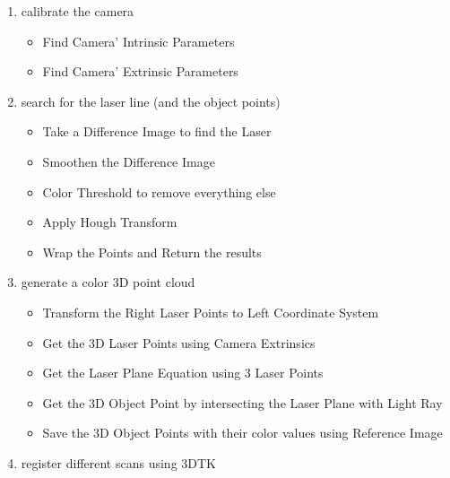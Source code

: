 
\begin{enumerate}
	\item calibrate the camera \cite{tsai:1987}
		\begin{itemize}
			\item Find Camera' Intrinsic Parameters
	    \item Find Camera' Extrinsic Parameters
		\end{itemize}
	\item search for the laser line (and the object points)	
		\begin{itemize}
			\item Take a Difference Image to find the Laser
	    \item Smoothen the Difference Image
	    \item Color Threshold to remove everything else
	    \item Apply Hough Transform
	    \item Wrap the Points and Return the results
		\end{itemize}	
	\item generate a color 3D point cloud	
		\begin{itemize}
			\item Transform the Right Laser Points to Left Coordinate System
	    \item Get the 3D Laser Points using Camera Extrinsics
	    \item Get the Laser Plane Equation using 3 Laser Points
	    \item Get the 3D Object Point by intersecting the
	 					Laser Plane with Light Ray
	    \item Save the 3D Object Points with their color values 
						using Reference Image
		\end{itemize}	
	\item register different scans using 3DTK
\end{enumerate}

